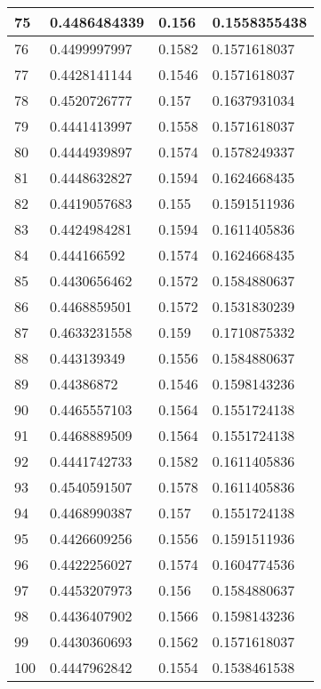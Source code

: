 \begin{table}[]
\begin{tabular}{|l|l|l|l|}
75    & 0.4486484339 & 0.156        & 0.1558355438 \\ \hline
76    & 0.4499997997 & 0.1582       & 0.1571618037 \\ \hline
77    & 0.4428141144 & 0.1546       & 0.1571618037 \\ \hline
78    & 0.4520726777 & 0.157        & 0.1637931034 \\ \hline
79    & 0.4441413997 & 0.1558       & 0.1571618037 \\ \hline
80    & 0.4444939897 & 0.1574       & 0.1578249337 \\ \hline
81    & 0.4448632827 & 0.1594       & 0.1624668435 \\ \hline
82    & 0.4419057683 & 0.155        & 0.1591511936 \\ \hline
83    & 0.4424984281 & 0.1594       & 0.1611405836 \\ \hline
84    & 0.444166592  & 0.1574       & 0.1624668435 \\ \hline
85    & 0.4430656462 & 0.1572       & 0.1584880637 \\ \hline
86    & 0.4468859501 & 0.1572       & 0.1531830239 \\ \hline
87    & 0.4633231558 & 0.159        & 0.1710875332 \\ \hline
88    & 0.443139349  & 0.1556       & 0.1584880637 \\ \hline
89    & 0.44386872   & 0.1546       & 0.1598143236 \\ \hline
90    & 0.4465557103 & 0.1564       & 0.1551724138 \\ \hline
91    & 0.4468889509 & 0.1564       & 0.1551724138 \\ \hline
92    & 0.4441742733 & 0.1582       & 0.1611405836 \\ \hline
93    & 0.4540591507 & 0.1578       & 0.1611405836 \\ \hline
94    & 0.4468990387 & 0.157        & 0.1551724138 \\ \hline
95    & 0.4426609256 & 0.1556       & 0.1591511936 \\ \hline
96    & 0.4422256027 & 0.1574       & 0.1604774536 \\ \hline
97    & 0.4453207973 & 0.156        & 0.1584880637 \\ \hline
98    & 0.4436407902 & 0.1566       & 0.1598143236 \\ \hline
99    & 0.4430360693 & 0.1562       & 0.1571618037 \\ \hline
100   & 0.4447962842 & 0.1554       & 0.1538461538 \\ \hline

\end{tabular}
\end{table}
